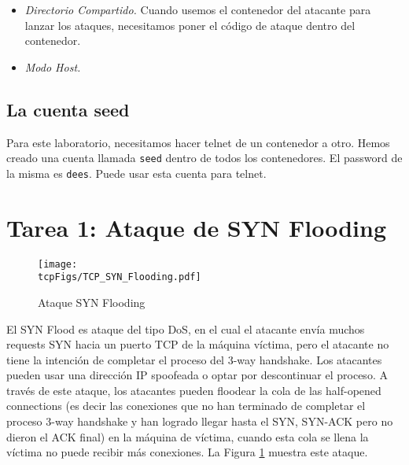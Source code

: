 \begin{itemize}
\item \textit{Directorio Compartido.} Cuando usemos el contenedor del atacante para lanzar los ataques, necesitamos poner el código de ataque dentro del contenedor.



\item \textit{Modo Host.}

\end{itemize}


%


\subsection{La cuenta seed} 

Para este laboratorio, necesitamos hacer telnet de un contenedor a otro.
Hemos creado una cuenta llamada \texttt{seed} dentro de todos los contenedores.
El password de la misma es \texttt{dees}. Puede usar esta cuenta para telnet.



\section{Tarea 1: Ataque de SYN Flooding}


\begin{figure}[htb]
  \begin{center}
    \texttt{[image: \\tcpFigs/TCP\_SYN\_Flooding.pdf]}
  \end{center}
  \caption{Ataque SYN Flooding}
  \label{tcp:fig:synflooding}
\end{figure}
 

El SYN Flood es ataque del tipo DoS, en el cual el atacante envía muchos requests SYN hacia un puerto TCP de la máquina víctima, pero el atacante no tiene la intención de completar el proceso del 3-way handshake. Los atacantes pueden usar una dirección IP spoofeada o optar por descontinuar el proceso.
A través de este ataque, los atacantes pueden floodear la cola de las half-opened connections (es decir las conexiones que no han terminado de completar el proceso 3-way handshake y han logrado llegar hasta el SYN, SYN-ACK pero no dieron el ACK final) en la máquina de víctima, cuando esta cola se llena la víctima no puede recibir más conexiones. La Figura \ref{tcp:fig:synflooding} muestra este ataque.

